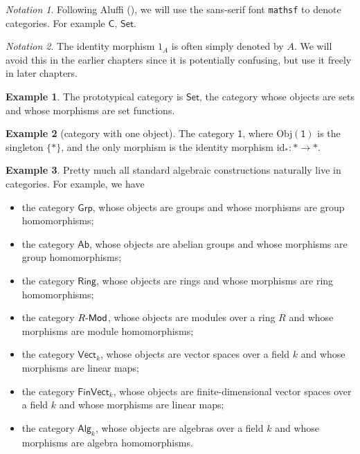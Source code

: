 \documentclass[a4paper,10pt]{scrreprt}
\newcommand{\Obj}{\mathrm{Obj}}
\def\mhyp{{\hbox{-}}}
\theoremstyle{definition}
\newtheorem{example}{Example}[section]
\theoremstyle{plain}
\theoremstyle{remark}
\newtheorem{notation}{Notation}[section]
\begin{document}
\begin{notation}
  Following Aluffi (\cite{aluffi-algebra-chapter-0}), we will use the sans-serif font \texttt{mathsf} to denote categories. For example $\mathsf{C}$, $\mathsf{Set}$.
\end{notation}

\begin{notation}
  The identity morphism $1_{A}$ is often simply denoted by $A$. We will avoid this in the earlier chapters since it is potentially confusing, but use it freely in later chapters.
\end{notation}

\begin{example}
  The prototypical category is $\mathsf{Set}$, the category whose objects are sets and whose morphisms are set functions.  
\end{example}


\begin{example}[category with one object]
  \label{eg:categorywithoneobject}
  The category $\mathsf{1}$, where $\Obj(\mathsf{1})$ is the singleton $\{*\}$, and the only morphism is the identity morphism $\mathrm{id}_{*}\colon * \to *$.
\end{example}
\begin{example}
  \label{eg:examplesofcategories}
  Pretty much all standard algebraic constructions naturally live in categories. For example, we have 
  \begin{itemize} 
    \item the category $\mathsf{Grp}$, whose objects are groups and whose morphisms are group homomorphisms;

    \item \label{item:categoryab} the category $\mathsf{Ab}$, whose objects are abelian groups and whose morphisms are group homomorphisms;

    \item the category $\mathsf{Ring}$, whose objects are rings and whose morphisms are ring homomorphisms;

    \item the category $R\mhyp\mathsf{Mod}$, whose objects are modules over a ring $R$ and whose morphisms are module homomorphisms;

    \item the category $\mathsf{Vect}_{k}$, whose objects are vector spaces over a field $k$ and whose morphisms are linear maps;
    \item the category $\mathsf{FinVect}_{k}$, whose objects are finite-dimensional vector spaces over a field $k$ and whose morphisms are linear maps;
    \item the category $\mathsf{Alg}_{k}$, whose objects are algebras over a field $k$ and whose morphisms are algebra homomorphisms.
  \end{itemize}
\end{example}
\end{document}
